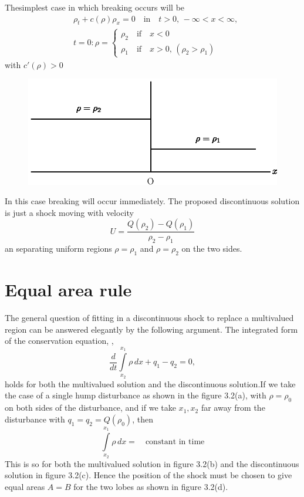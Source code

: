 \begin{example*}
The\pageoriginale simplest case in which breaking occurs will be 
\begin{align*}
&\rho_t +c(\rho)\rho_x =0\quad\text{in}\quad t>0, \, -\infty < x < \infty,\\
&t=0:\rho=
\begin{cases}
\rho_2\quad\text{if}\quad x<0\\
\rho_1\quad\text{if}\quad x>0, \, \left(\rho_2>\rho_1\right)
\end{cases}
\end{align*}
with $c'(\rho)>0$
\begin{figure}[H]
\centering
\includegraphics{figures/fig61-3.1.eps}
\caption{}
\label{chap1:fig3.1}
\end{figure}

In this case breaking will occur immediately. The proposed discontinuous solution is just a shock moving with velocity
$$
U=\frac{Q\left(\rho_2\right)-Q\left(\rho_1\right)}{\rho_2 - \rho_1}
$$
an separating uniform regions $\rho=\rho_1$ and $\rho=\rho_2$ on the two sides.
\end{example*}

\section{Equal area rule}\label{chap3:sec3.2}
 
The general question of fitting in a discontinuous shock to replace a multivalued region can be answered elegantly by the following argument. The integrated form of the conservation equation, \ie,
$$
\frac{d}{dt}\int\limits_{x_2}^{x_1}\rho \,dx +q_1 -q_2 =0,
$$
holds for both the multivalued solution and the discontinuous solution.\pageoriginale If we take the case of a single hump disturbance as shown in the figure 3.2(a), with $\rho=\rho_0$ on both sides of the disturbance, and if we take $x_1, x_2$ far away from the disturbance with $q_1=q_2=Q(\rho_0)$, then
$$
\int\limits_{x_2}^{x_1}\rho\,dx =\quad\text{constant in time}
$$
This is so for both the multivalued solution in figure 3.2(b) and the discontinuous solution in figure 3.2(c). Hence the position of the shock must be chosen to give equal areas $A=B$ for the two lobes as shown in figure 3.2(d).

